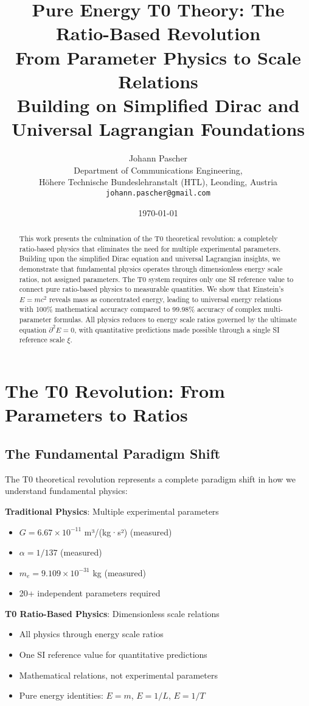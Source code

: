 \documentclass[12pt,a4paper]{article}
\title{Pure Energy T0 Theory: The Ratio-Based Revolution \\
	From Parameter Physics to Scale Relations \\
	\large Building on Simplified Dirac and Universal Lagrangian Foundations}
\author{Johann Pascher\\
	Department of Communications Engineering, \\H\"ohere Technische Bundeslehranstalt (HTL), Leonding, Austria\\
	\texttt{johann.pascher@gmail.com}}
\date{\today}
\newcommand{\Efield}{E}
\newcommand{\xipar}{\xi}
\theoremstyle{definition}
\theoremstyle{remark}
\begin{document}
	
	\maketitle
	
	\begin{abstract}
		This work presents the culmination of the T0 theoretical revolution: a completely ratio-based physics that eliminates the need for multiple experimental parameters. Building upon the simplified Dirac equation and universal Lagrangian insights, we demonstrate that fundamental physics operates through dimensionless energy scale ratios, not assigned parameters. The T0 system requires only one SI reference value to connect pure ratio-based physics to measurable quantities. We show that Einstein's $E = mc^2$ reveals mass as concentrated energy, leading to universal energy relations with 100\% mathematical accuracy compared to 99.98\% accuracy of complex multi-parameter formulas. All physics reduces to energy scale ratios governed by the ultimate equation $\partial^2 \Efield = 0$, with quantitative predictions made possible through a single SI reference scale $\xipar$.
	\end{abstract}
	
	\tableofcontents
	\newpage
	
	\section{The T0 Revolution: From Parameters to Ratios}
	
	\subsection{The Fundamental Paradigm Shift}
	
	The T0 theoretical revolution represents a complete paradigm shift in how we understand fundamental physics:
	
	\begin{tcolorbox}[colback=red!5!white,colframe=red!75!black,title=Paradigm Revolution]
		\textbf{Traditional Physics}: Multiple experimental parameters
		\begin{itemize}
			\item $G = 6.67 \times 10^{-11}$ m³/(kg·s²) (measured)
			\item $\alpha = 1/137$ (measured)
			\item $m_e = 9.109 \times 10^{-31}$ kg (measured)
			\item 20+ independent parameters required
		\end{itemize}
		
		\textbf{T0 Ratio-Based Physics}: Dimensionless scale relations
		\begin{itemize}
			\item All physics through energy scale ratios
			\item One SI reference value for quantitative predictions
			\item Mathematical relations, not experimental parameters
			\item Pure energy identities: $E = m$, $E = 1/L$, $E = 1/T$
		\end{itemize}
	\end{tcolorbox}
	
\end{document}
